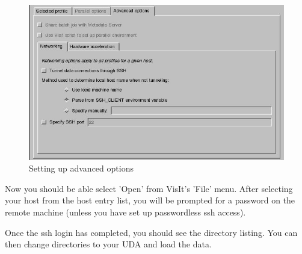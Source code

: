 \documentclass[12pt]{article}
\begin{document}
\begin{figure}

  \center
  \includegraphics[scale=0.20]{VisItHostProfileAdv2.png}
  \caption{Setting up advanced options}
  \label{VisItHostProfileAdv2}

\end{figure}

Now you should be able select 'Open' from VisIt's 'File' menu. After
selecting your host from the host entry list, you will be prompted for
a password on the remote machine (unless you have set up passwordless
ssh access).

Once the ssh login has completed, you should see the directory
listing. You can then change directories to your UDA and load the
data.










\end{document}
